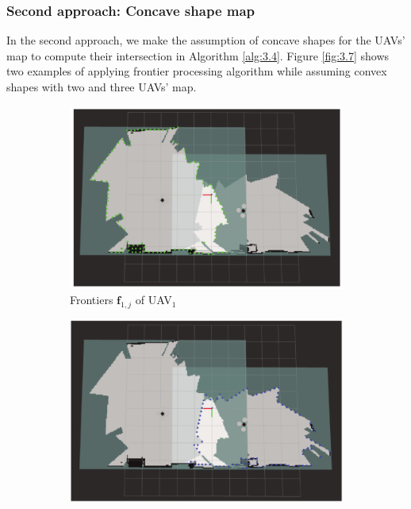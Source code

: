\documentclass[11pt,openany]{book}
\begin{document}
\subsubsection{Second approach: Concave shape map}
In the second approach, we make the assumption of concave shapes for the UAVs’ map to compute their intersection in Algorithm \ref{alg:3.4}. Figure \ref{fig:3.7} shows two examples of applying frontier processing algorithm while assuming convex shapes with two and three UAVs’ map.
\begin{figure}[H]
    \centering
    \begin{subfigure}[H]{0.6\linewidth}
        \centering
        \includegraphics[width=\linewidth]{assets/3_5_a.png}
        \caption{{Frontiers $\mathbf{f}_{1,j}$ of UAV$_1$}}
        \label{fig:3.5a}
    \end{subfigure}
    \begin{subfigure}[H]{0.6\linewidth}
        \centering
        \includegraphics[width=\linewidth]{assets/3_5_b.png}

\end{subfigure}
\end{figure}
\end{document}
